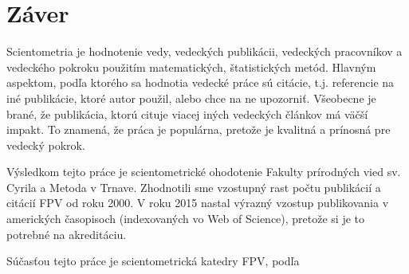 \chapter*{Záver}

Scientometria je hodnotenie vedy, vedeckých publikácii, vedeckých pracovníkov a
vedeckého pokroku použitím matematických, štatistických metód.  Hlavným
aspektom, podľa ktorého sa hodnotia vedecké práce sú citácie, t.j. referencie na
iné publikácie, ktoré autor použil, alebo chce na ne upozorniť.  Všeobecne je
brané, že publikácia, ktorú cituje viacej iných vedeckých článkov má väčší
impakt.  To znamená, že práca je populárna, pretože je kvalitná a prínosná pre
vedecký pokrok.

Výsledkom tejto práce je scientometrické ohodotenie Fakulty prírodných vied
sv. Cyrila a Metoda v Trnave. Zhodnotili sme vzostupný rast počtu publikácií a 
citácií FPV od roku 2000. V roku 2015 nastal výrazný vzostup publikovania v
amerických časopisoch (indexovaných vo Web of Science), pretože si je to 
potrebné na akreditáciu.

Súčasťou tejto práce je scientometrická katedry FPV, podľa 

